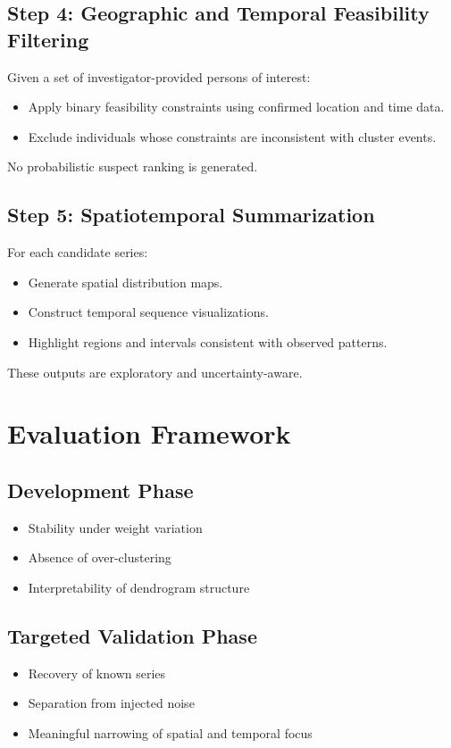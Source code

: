 \documentclass[12pt]{article}
\begin{document}
\subsection{Step 4: Geographic and Temporal Feasibility Filtering}

Given a set of investigator-provided persons of interest:
\begin{itemize}
    \item Apply binary feasibility constraints using confirmed location and time data.
    \item Exclude individuals whose constraints are inconsistent with cluster events.
\end{itemize}

No probabilistic suspect ranking is generated.

\subsection{Step 5: Spatiotemporal Summarization}

For each candidate series:
\begin{itemize}
    \item Generate spatial distribution maps.
    \item Construct temporal sequence visualizations.
    \item Highlight regions and intervals consistent with observed patterns.
\end{itemize}

These outputs are exploratory and uncertainty-aware.

\section{Evaluation Framework}

\subsection{Development Phase}
\begin{itemize}
    \item Stability under weight variation
    \item Absence of over-clustering
    \item Interpretability of dendrogram structure
\end{itemize}

\subsection{Targeted Validation Phase}
\begin{itemize}
    \item Recovery of known series
    \item Separation from injected noise
    \item Meaningful narrowing of spatial and temporal focus
\end{itemize}
\end{document}
